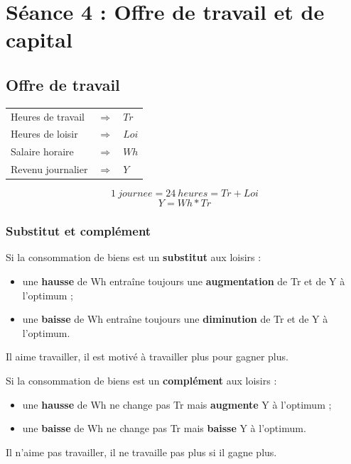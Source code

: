 \section{Séance 4 : Offre de travail et de capital}


\subsection{Offre de travail}



\begin{tabular}{lll}
	Heures de travail & $\Rightarrow$ & $Tr$\\
	Heures de loisir  & $\Rightarrow$ & $Loi$\\
	Salaire horaire   & $\Rightarrow$ & $Wh$\\
	Revenu journalier & $\Rightarrow$ & $Y$\\
\end{tabular}

$$1\ journee = 24\ heures = Tr + Loi$$
$$Y = Wh * Tr$$



\subsubsection{Substitut et complément}



Si la consommation de biens est un \textbf{substitut} aux loisirs :
\begin{itemize}
	\item une \textbf{hausse} de Wh entraîne toujours une \textbf{augmentation} de Tr et de Y à l'optimum ;
	\item une \textbf{baisse} de Wh entraîne toujours une \textbf{diminution} de Tr et de Y à l'optimum.
\end{itemize}
Il aime travailler, il est motivé à travailler plus pour gagner plus.


\vspace{0.5cm}


Si la consommation de biens est un \textbf{complément} aux loisirs :
\begin{itemize}
	\item une \textbf{hausse} de Wh ne change pas Tr mais \textbf{augmente} Y à l'optimum ;
	\item une \textbf{baisse} de Wh ne change pas Tr mais \textbf{baisse} Y à l'optimum.
\end{itemize}
Il n'aime pas travailler, il ne travaille pas plus si il gagne plus.\\


